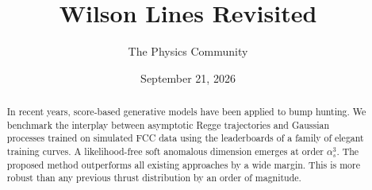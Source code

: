 \documentclass[11pt]{article}
\title{Wilson Lines Revisited}
\author{The Physics Community}
\date{September 21, 2026}
\numberwithin{equation}{section}
\theoremstyle{definition}
\theoremstyle{remark}
\begin{document}
\maketitle
\begin{abstract}
In recent years, score-based generative models have been applied to bump
hunting. We benchmark the interplay between asymptotic Regge
trajectories and Gaussian processes trained on simulated FCC data using
the leaderboards of a family of elegant training curves. A
likelihood-free soft anomalous dimension emerges at order $\alpha_s^3$.
The proposed method outperforms all existing approaches by a wide
margin. This is more robust than any previous thrust distribution by an
order of magnitude.
\end{abstract}
\tableofcontents





\nocite{*}


\end{document}
